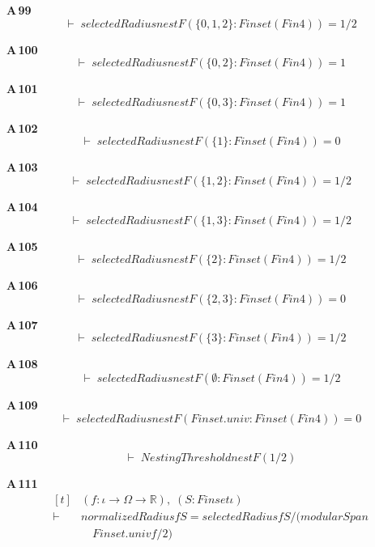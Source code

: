 \noindent\textbf{A\,99}\quad{}
{\footnotesize\[ \vdash\; \mathit{selectedRadius} \mathit{nestF} (\{ 0,1,2\} : \mathit{Finset} (\mathit{Fin} 4)) = 1 / 2 \]}

\noindent\textbf{A\,100}\quad{}
{\footnotesize\[ \vdash\; \mathit{selectedRadius} \mathit{nestF} (\{ 0,2\} : \mathit{Finset} (\mathit{Fin} 4)) = 1 \]}

\noindent\textbf{A\,101}\quad{}
{\footnotesize\[ \vdash\; \mathit{selectedRadius} \mathit{nestF} (\{ 0,3\} : \mathit{Finset} (\mathit{Fin} 4)) = 1 \]}

\noindent\textbf{A\,102}\quad{}
{\footnotesize\[ \vdash\; \mathit{selectedRadius} \mathit{nestF} (\{ 1\} : \mathit{Finset} (\mathit{Fin} 4)) = 0 \]}

\noindent\textbf{A\,103}\quad{}
{\footnotesize\[ \vdash\; \mathit{selectedRadius} \mathit{nestF} (\{ 1,2\} : \mathit{Finset} (\mathit{Fin} 4)) = 1 / 2 \]}

\noindent\textbf{A\,104}\quad{}
{\footnotesize\[ \vdash\; \mathit{selectedRadius} \mathit{nestF} (\{ 1,3\} : \mathit{Finset} (\mathit{Fin} 4)) = 1 / 2 \]}

\noindent\textbf{A\,105}\quad{}
{\footnotesize\[ \vdash\; \mathit{selectedRadius} \mathit{nestF} (\{ 2\} : \mathit{Finset} (\mathit{Fin} 4)) = 1 / 2 \]}

\noindent\textbf{A\,106}\quad{}
{\footnotesize\[ \vdash\; \mathit{selectedRadius} \mathit{nestF} (\{ 2,3\} : \mathit{Finset} (\mathit{Fin} 4)) = 0 \]}

\noindent\textbf{A\,107}\quad{}
{\footnotesize\[ \vdash\; \mathit{selectedRadius} \mathit{nestF} (\{ 3\} : \mathit{Finset} (\mathit{Fin} 4)) = 1 / 2 \]}

\noindent\textbf{A\,108}\quad{}
{\footnotesize\[ \vdash\; \mathit{selectedRadius} \mathit{nestF} (\emptyset : \mathit{Finset} (\mathit{Fin} 4)) = 1 / 2 \]}

\noindent\textbf{A\,109}\quad{}
{\footnotesize\[ \vdash\; \mathit{selectedRadius} \mathit{nestF} (\mathit{Finset}.\mathit{univ} : \mathit{Finset} (\mathit{Fin} 4)) = 0 \]}

\noindent\textbf{A\,110}\quad{}
{\footnotesize\[ \vdash\; \mathit{NestingThreshold} \mathit{nestF} (1 / 2) \]}

\noindent\textbf{A\,111}\quad{}
{\footnotesize\[ \begin{aligned}[t]
&(\mathit{f} : \iota \to \Omega \to \mathbb{R} ),\; (\mathit{S} : \mathit{Finset} \iota )\\
\vdash\;&\mathit{normalizedRadius} \mathit{f} \mathit{S} = \mathit{selectedRadius} \mathit{f} \mathit{S} / (\mathit{modularSpan}\\
&\quad \mathit{Finset}.\mathit{univ} \mathit{f} / 2)
\end{aligned} \]}

